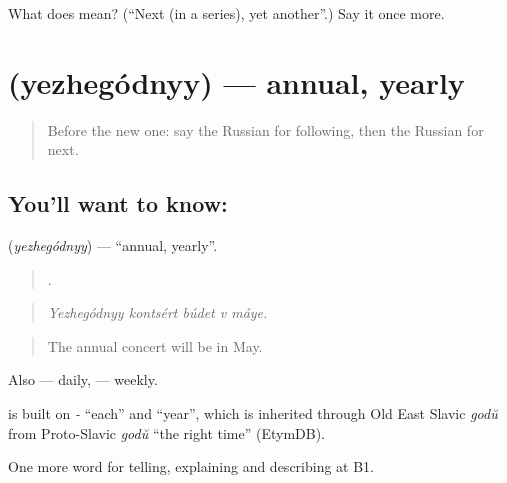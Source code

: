 \begin{tcolorbox}[breakable,colback=teal!4,colframe=teal!35!black,title={Before you move on}]
What does  mean? (\textquotedblleft{}Next (in a series), yet another\textquotedblright{}.) Say it once more.
\end{tcolorbox}
\section[\texorpdfstring{\ru{ежегодный} (yezhegódnyy)}{ежегодный (yezhegódnyy)}]{ (yezhegódnyy) — annual, yearly}

\label{lesson:RU-C277-yezhegodnyy}



\begin{quote}
Before the new one: say the Russian for following, then the Russian for next.
\end{quote}

\subsection*{You'll want to know: }
\textbf{} (\emph{yezhegódnyy}) — \textquotedblleft{}annual, yearly\textquotedblright{}.

\begin{quote}
    .
\end{quote}

\begin{quote}
\emph{Yezhegódnyy kontsért búdet v máye.}
\end{quote}

\begin{quote}
The annual concert will be in May.
\end{quote}

Also \emph{} — daily, \emph{} — weekly.

\begin{cousinweb}
\emph{} is built on \emph{-} \textquotedblleft{}each\textquotedblright{} and \emph{} \textquotedblleft{}year\textquotedblright{}, which is inherited through Old East Slavic \emph{godŭ} from Proto-Slavic \emph{godŭ} \textquotedblleft{}the right time\textquotedblright{} (EtymDB).
\end{cousinweb}

\begin{grammarlens}[title={What you've built}]
One more word for telling, explaining and describing at B1.
\end{grammarlens}

